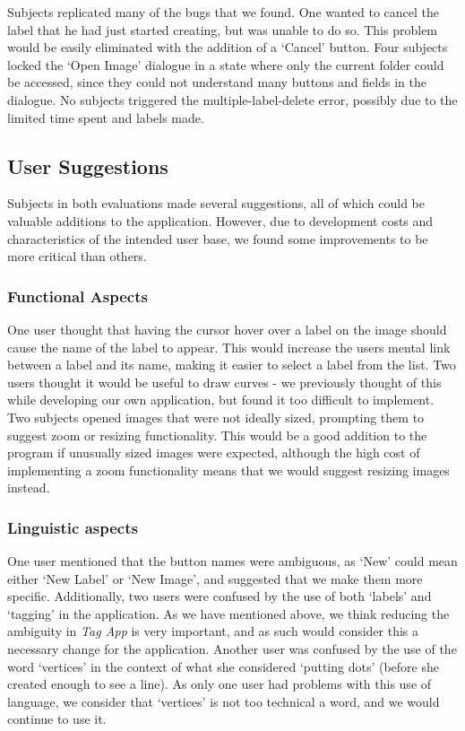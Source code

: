 \documentclass[11pt,twocolumn]{article}
\begin{document}
Subjects replicated many of the bugs that we found. One wanted to cancel the
label that he had just started creating, but was unable to do so. This problem
would be easily eliminated with the addition of a `Cancel' button. Four
subjects locked the `Open Image' dialogue in a state where only the current
folder could be accessed, since they could not understand many buttons and
fields in the dialogue. No subjects triggered the multiple-label-delete
error, possibly due to the limited time spent and labels made.

\subsection{User Suggestions}

Subjects in both evaluations made several suggestions, all of which could be
valuable additions to the application. However, due to development costs and
characteristics of the intended user base, we found some improvements to be
more critical than others.

\subsubsection{Functional Aspects}

One user thought that having the cursor hover over a label on the image should
cause the name of the label to appear. This would increase the users mental
link between a label and its name, making it easier to select a label from the
list. Two users thought it would be useful to draw curves - we previously
thought of this while developing our own application, but found it too
difficult to implement. Two subjects opened images that were not ideally sized,
prompting them to suggest zoom or resizing functionality. This would be a good
addition to the program if unusually sized images were expected, although the
high cost of implementing a zoom functionality means that we would suggest
resizing images instead.

\subsubsection{Linguistic aspects}

One user mentioned that the button names were ambiguous, as `New' could mean
either `New Label' or `New Image', and suggested that we make them more
specific. Additionally, two users were confused by the use of both `labels' and
`tagging' in the application. As we have mentioned above, we think reducing the
ambiguity in \emph{Tag App} is very important, and as such would consider this a
necessary change for the application. Another user was confused by the use of
the word `vertices' in the context of what she considered `putting dots'
(before she created enough to see a line). As only one user had problems with
this use of language, we consider that `vertices' is not too technical a word,
and we would continue to use it.
\end{document}
